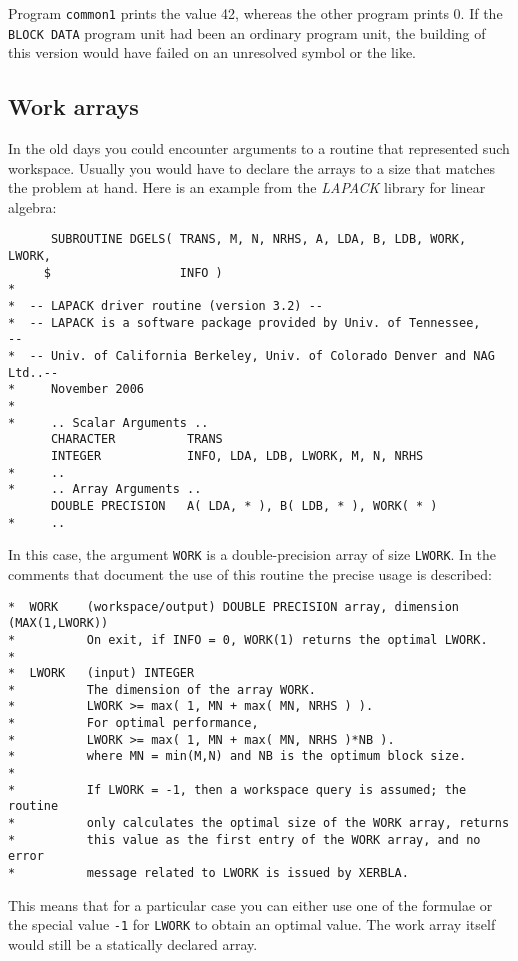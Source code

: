 Program \verb+common1+ prints the value 42, whereas the other
program prints 0. If the \verb+BLOCK DATA+ program unit had been
an ordinary program unit, the building of this version would have failed
on an unresolved symbol or the like.


\subsection{Work arrays}
\label{workarrays}
In the old days you could encounter arguments to a routine that represented
such workspace. Usually you would have to declare the arrays to a size that
matches the problem at hand. Here is an example from the \emph{LAPACK} library
for linear algebra:
%
\begin{verbatim}
      SUBROUTINE DGELS( TRANS, M, N, NRHS, A, LDA, B, LDB, WORK, LWORK,
     $                  INFO )
*
*  -- LAPACK driver routine (version 3.2) --
*  -- LAPACK is a software package provided by Univ. of Tennessee,    --
*  -- Univ. of California Berkeley, Univ. of Colorado Denver and NAG Ltd..--
*     November 2006
*
*     .. Scalar Arguments ..
      CHARACTER          TRANS
      INTEGER            INFO, LDA, LDB, LWORK, M, N, NRHS
*     ..
*     .. Array Arguments ..
      DOUBLE PRECISION   A( LDA, * ), B( LDB, * ), WORK( * )
*     ..
\end{verbatim}

In this case, the argument \verb+WORK+ is a double-precision array of
size \verb+LWORK+. In the comments that document the use of this routine
the precise usage is described:
%
\begin{verbatim}
*  WORK    (workspace/output) DOUBLE PRECISION array, dimension (MAX(1,LWORK))
*          On exit, if INFO = 0, WORK(1) returns the optimal LWORK.
*
*  LWORK   (input) INTEGER
*          The dimension of the array WORK.
*          LWORK >= max( 1, MN + max( MN, NRHS ) ).
*          For optimal performance,
*          LWORK >= max( 1, MN + max( MN, NRHS )*NB ).
*          where MN = min(M,N) and NB is the optimum block size.
*
*          If LWORK = -1, then a workspace query is assumed; the routine
*          only calculates the optimal size of the WORK array, returns
*          this value as the first entry of the WORK array, and no error
*          message related to LWORK is issued by XERBLA.
\end{verbatim}

This means that for a particular case you can either use one of the formulae
or the special value \verb+-1+ for \verb+LWORK+ to obtain an optimal value.
The work array itself would still be a statically declared array.

